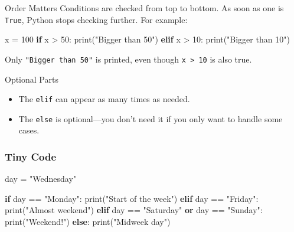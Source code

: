 \documentclass[
  letterpaper,
  DIV=11,
  numbers=noendperiod]{scrreprt}
\newenvironment{Shaded}{\begin{snugshade}}{\end{snugshade}}
\newcommand{\BuiltInTok}[1]{\textcolor[rgb]{0.00,0.23,0.31}{#1}}
\newcommand{\ControlFlowTok}[1]{\textcolor[rgb]{0.00,0.23,0.31}{\textbf{#1}}}
\newcommand{\DecValTok}[1]{\textcolor[rgb]{0.68,0.00,0.00}{#1}}
\newcommand{\KeywordTok}[1]{\textcolor[rgb]{0.00,0.23,0.31}{\textbf{#1}}}
\newcommand{\NormalTok}[1]{\textcolor[rgb]{0.00,0.23,0.31}{#1}}
\newcommand{\OperatorTok}[1]{\textcolor[rgb]{0.37,0.37,0.37}{#1}}
\newcommand{\StringTok}[1]{\textcolor[rgb]{0.13,0.47,0.30}{#1}}
\providecommand{\tightlist}{%
  \setlength{\itemsep}{0pt}\setlength{\parskip}{0pt}}
\begin{document}
Order Matters Conditions are checked from top to bottom. As soon as one
is \texttt{True}, Python stops checking further. For example:

\begin{Shaded}
\begin{Highlighting}[]
\NormalTok{x }\OperatorTok{=} \DecValTok{100}
\ControlFlowTok{if}\NormalTok{ x }\OperatorTok{\textgreater{}} \DecValTok{50}\NormalTok{:}
    \BuiltInTok{print}\NormalTok{(}\StringTok{"Bigger than 50"}\NormalTok{)}
\ControlFlowTok{elif}\NormalTok{ x }\OperatorTok{\textgreater{}} \DecValTok{10}\NormalTok{:}
    \BuiltInTok{print}\NormalTok{(}\StringTok{"Bigger than 10"}\NormalTok{)}
\end{Highlighting}
\end{Shaded}

Only \texttt{"Bigger\ than\ 50"} is printed, even though
\texttt{x\ \textgreater{}\ 10} is also true.

Optional Parts

\begin{itemize}
\tightlist
\item
  The \texttt{elif} can appear as many times as needed.
\item
  The \texttt{else} is optional---you don't need it if you only want to
  handle some cases.
\end{itemize}

\subsubsection{Tiny Code}\label{tiny-code-15}

\begin{Shaded}
\begin{Highlighting}[]
\NormalTok{day }\OperatorTok{=} \StringTok{"Wednesday"}

\ControlFlowTok{if}\NormalTok{ day }\OperatorTok{==} \StringTok{"Monday"}\NormalTok{:}
    \BuiltInTok{print}\NormalTok{(}\StringTok{"Start of the week"}\NormalTok{)}
\ControlFlowTok{elif}\NormalTok{ day }\OperatorTok{==} \StringTok{"Friday"}\NormalTok{:}
    \BuiltInTok{print}\NormalTok{(}\StringTok{"Almost weekend"}\NormalTok{)}
\ControlFlowTok{elif}\NormalTok{ day }\OperatorTok{==} \StringTok{"Saturday"} \KeywordTok{or}\NormalTok{ day }\OperatorTok{==} \StringTok{"Sunday"}\NormalTok{:}
    \BuiltInTok{print}\NormalTok{(}\StringTok{"Weekend!"}\NormalTok{)}
\ControlFlowTok{else}\NormalTok{:}
    \BuiltInTok{print}\NormalTok{(}\StringTok{"Midweek day"}\NormalTok{)}
\end{Highlighting}
\end{Shaded}
\end{document}
